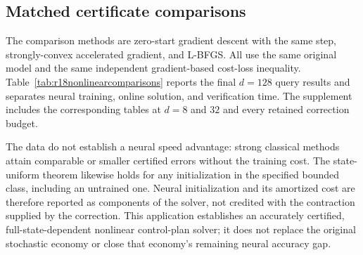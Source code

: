 \subsection{Matched certificate comparisons}
The comparison methods are zero-start gradient descent with the same step, strongly-convex accelerated gradient, and L-BFGS. All use the same original model and the same independent gradient-based cost-loss inequality. Table~\ref{tab:r18nonlinearcomparisons} reports the final $d=128$ query results and separates neural training, online solution, and verification time. The supplement includes the corresponding tables at $d=8$ and $32$ and every retained correction budget.


The data do not establish a neural speed advantage: strong classical methods attain comparable or smaller certified errors without the training cost. The state-uniform theorem likewise holds for any initialization in the specified bounded class, including an untrained one. Neural initialization and its amortized cost are therefore reported as components of the solver, not credited with the contraction supplied by the correction. This application establishes an accurately certified, full-state-dependent nonlinear control-plan solver; it does not replace the original stochastic economy or close that economy's remaining neural accuracy gap.
